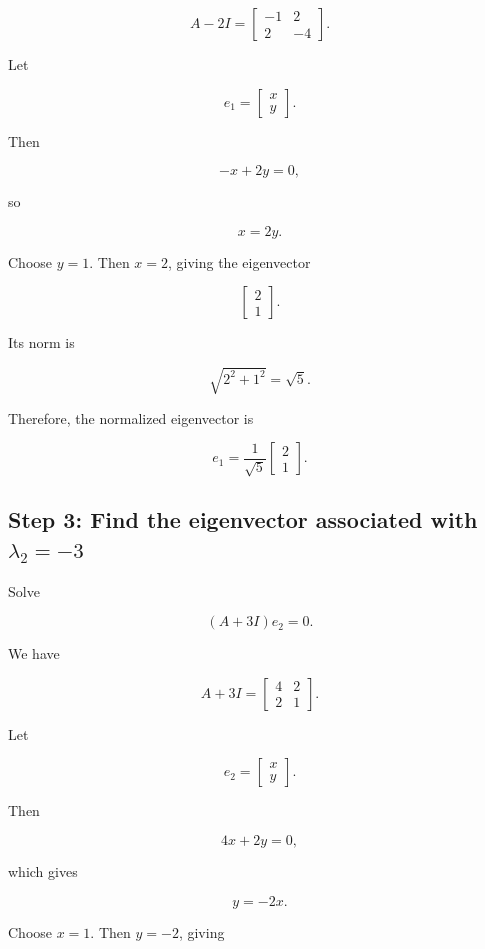 \documentclass[12pt]{article}
\begin{document}
\[
A-2I
=
\begin{bmatrix}
-1 & 2\\
2 & -4
\end{bmatrix}.
\]

Let

\[
e_1=
\begin{bmatrix}
x\\
y
\end{bmatrix}.
\]

Then

\[
-x+2y=0,
\]

so

\[
x=2y.
\]

Choose $y=1$. Then $x=2$, giving the eigenvector

\[
\begin{bmatrix}
2\\
1
\end{bmatrix}.
\]

Its norm is

\[
\sqrt{2^2+1^2}
=
\sqrt{5}.
\]

Therefore, the normalized eigenvector is

\[
\boxed{
e_1=
\frac{1}{\sqrt{5}}
\begin{bmatrix}
2\\
1
\end{bmatrix}
}.
\]

\subsection*{Step 3: Find the eigenvector associated with $\lambda_2=-3$}

Solve

\[
(A+3I)e_2=0.
\]

We have

\[
A+3I
=
\begin{bmatrix}
4 & 2\\
2 & 1
\end{bmatrix}.
\]

Let

\[
e_2=
\begin{bmatrix}
x\\
y
\end{bmatrix}.
\]

Then

\[
4x+2y=0,
\]

which gives

\[
y=-2x.
\]

Choose $x=1$. Then $y=-2$, giving
\end{document}

